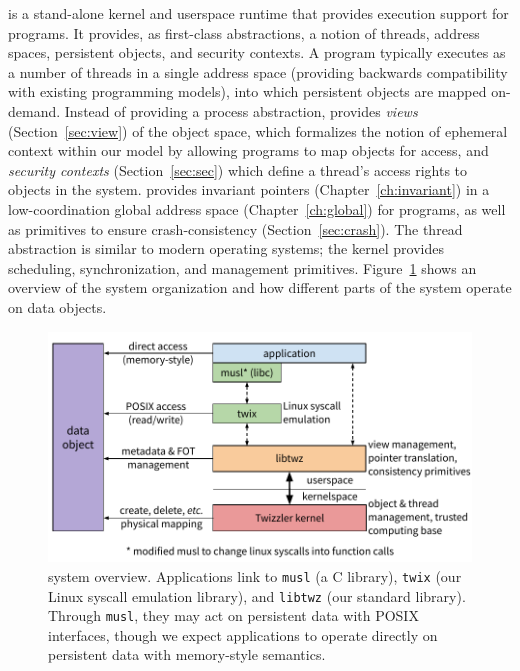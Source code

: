 \Twizzler is a stand-alone kernel and userspace runtime that provides execution support
for programs. It provides, as first-class abstractions, a notion of threads, address spaces,
persistent objects, and security contexts. A program
typically executes as a number of threads in a single address space (providing backwards
compatibility with existing programming models), into which persistent objects are mapped on-demand.
Instead of providing a process abstraction, \Twizzler provides \emph{views}
(Section~\ref{sec:view}) of the object space, which formalizes the notion of ephemeral context within our
model by allowing programs to map objects for access,
and \emph{security contexts} (Section~\ref{sec:sec}) which define a thread's access rights to objects in the system.
\Twizzler provides invariant pointers (Chapter~\ref{ch:invariant}) in a low-coordination global address space (Chapter~\ref{ch:global}) for
programs, as well as primitives to ensure crash-consistency
(Section~\ref{sec:crash}). The thread abstraction is similar to modern operating systems; the
kernel provides scheduling, synchronization, and management primitives.
Figure~\ref{fig:twz_sys_overview} shows an overview of the system
organization and how different parts of the system operate on data objects.

\begin{figure}
    \centering
    \includegraphics[width=\linewidth]{fig/sys_diag}
    \caption{\Twizzler system overview. Applications link to \texttt{musl} (a C library),
        \texttt{twix} (our Linux syscall emulation library), and \texttt{libtwz} (our standard
        library). Through \texttt{musl}, they may act on persistent data with POSIX interfaces,
        though we expect \Twizzler applications to operate directly on persistent data with
        memory-style semantics.}
    \label{fig:twz_sys_overview}
\end{figure}


